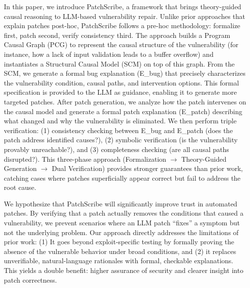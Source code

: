 \documentclass[conference,compsoc]{IEEEtran}
\begin{document}
In this paper, we introduce PatchScribe, a framework that brings
theory-guided causal reasoning to LLM-based vulnerability repair. Unlike
prior approaches that explain patches post-hoc, PatchScribe follows a
pre-hoc methodology: formalize first, patch second, verify consistency
third. The approach builds a Program Causal Graph (PCG) to represent the
causal structure of the vulnerability (for instance, how a lack of input
validation leads to a buffer overflow) and instantiates a Structural
Causal Model (SCM) on top of this graph. From the SCM, we generate a
formal bug explanation (E\_bug) that precisely characterizes the
vulnerability condition, causal paths, and intervention options. This
formal specification is provided to the LLM as guidance, enabling it to
generate more targeted patches. After patch generation, we analyze how
the patch intervenes on the causal model and generate a formal patch
explanation (E\_patch) describing what changed and why the vulnerability
is eliminated. We then perform triple verification: (1) consistency
checking between E\_bug and E\_patch (does the patch address identified
causes?), (2) symbolic verification (is the vulnerability provably
unreachable?), and (3) completeness checking (are all causal paths
disrupted?). This three-phase approach (Formalization \(\rightarrow\) Theory-Guided
Generation \(\rightarrow\) Dual Verification) provides stronger guarantees than prior
work, catching cases where patches superficially appear correct but fail
to address the root cause.

We hypothesize that PatchScribe will significantly improve trust in
automated patches. By verifying that a patch actually removes the
conditions that caused a vulnerability, we prevent scenarios where an
LLM patch ``fixes'' a symptom but not the underlying problem. Our
approach directly addresses the limitations of prior work: (1) It goes
beyond exploit-specific testing by formally proving the absence of the
vulnerable behavior under broad conditions, and (2) it replaces
unverifiable, natural-language rationales with formal, checkable
explanations. This yields a double benefit: higher assurance of security
and clearer insight into patch correctness.
\end{document}
